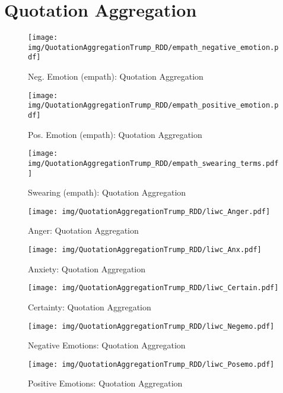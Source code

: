 \section{Quotation Aggregation}

\begin{figure}[h]\centering
\texttt{[image: img/QuotationAggregationTrump\_RDD/empath\_negative\_emotion.pdf]}
\caption{Neg. Emotion (empath): Quotation Aggregation}
\label{fig: qa_Neg. Emotion (empath)}
\end{figure}

\begin{figure}[h]\centering
\texttt{[image: img/QuotationAggregationTrump\_RDD/empath\_positive\_emotion.pdf]}
\caption{Pos. Emotion (empath): Quotation Aggregation}
\label{fig: qa_Pos. Emotion (empath)}
\end{figure}

\begin{figure}[h]\centering
\texttt{[image: img/QuotationAggregationTrump\_RDD/empath\_swearing\_terms.pdf]}
\caption{Swearing (empath): Quotation Aggregation}
\label{fig: qa_Swearing (empath)}
\end{figure}

\begin{figure}[h]\centering
\texttt{[image: img/QuotationAggregationTrump\_RDD/liwc\_Anger.pdf]}
\caption{Anger: Quotation Aggregation}
\label{fig: qa_Anger}
\end{figure}

\begin{figure}[h]\centering
\texttt{[image: img/QuotationAggregationTrump\_RDD/liwc\_Anx.pdf]}
\caption{Anxiety: Quotation Aggregation}
\label{fig: qa_Anxiety}
\end{figure}

\begin{figure}[h]\centering
\texttt{[image: img/QuotationAggregationTrump\_RDD/liwc\_Certain.pdf]}
\caption{Certainty: Quotation Aggregation}
\label{fig: qa_Certainty}
\end{figure}

\begin{figure}[h]\centering
\texttt{[image: img/QuotationAggregationTrump\_RDD/liwc\_Negemo.pdf]}
\caption{Negative Emotions: Quotation Aggregation}
\label{fig: qa_Negative Emotions}
\end{figure}

\begin{figure}[h]\centering
\texttt{[image: img/QuotationAggregationTrump\_RDD/liwc\_Posemo.pdf]}
\caption{Positive Emotions: Quotation Aggregation}
\label{fig: qa_Positive Emotions}
\end{figure}


